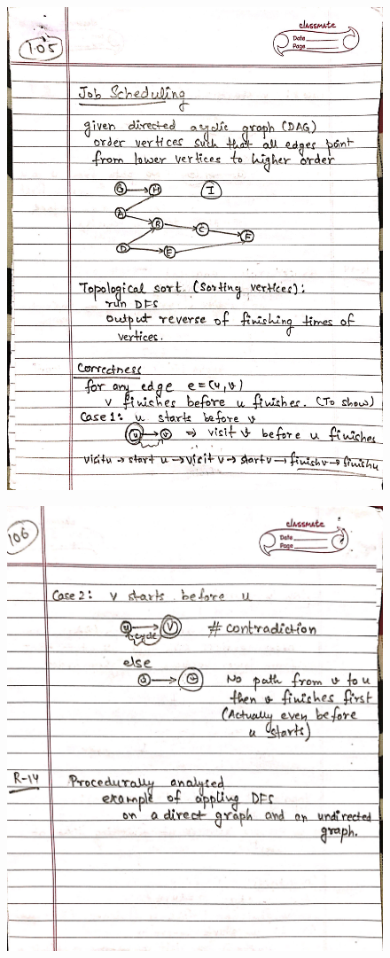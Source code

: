 \newpage
\begin{figure}[H]
    \centering
    \includegraphics[scale=0.25]{"./MIT 6.006/MIT_6006_105"}
\end{figure}
\newpage
\begin{figure}[H]
    \centering
    \includegraphics[scale=0.25]{"./MIT 6.006/MIT_6006_106"}
\end{figure}

